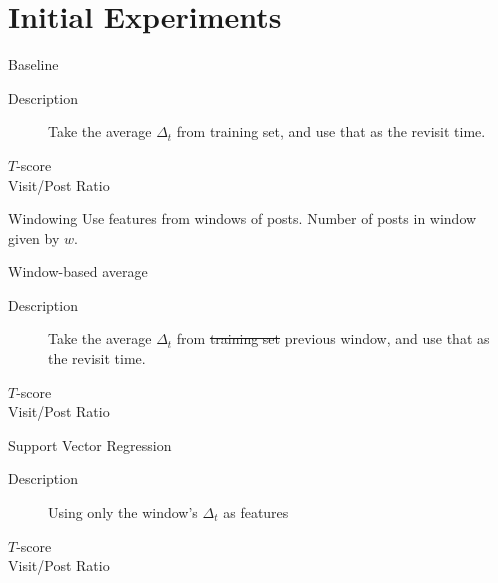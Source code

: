 \documentclass[12pt]{presentation}
\begin{document}
\section{Initial Experiments}


\begin{frame}{Baseline}
	\begin{description}
		\item[Description] Take the average $\Delta_t$ from training set, and 
			use that as the revisit time.
		\item[$T$-score]
		\item[Visit/Post Ratio]
	\end{description}
\end{frame}

\begin{frame}{Windowing}
Use features from windows of posts. Number of posts in window given by $w$.
\begin{center}

\end{center}
\end{frame}


\begin{frame}{Window-based average}
	\begin{description}
		\item[Description] Take the average $\Delta_t$ from \sout{training set} 
			previous window, and use that as the revisit time.
		\item[$T$-score]
		\item[Visit/Post Ratio]
	\end{description}
\end{frame}

\begin{frame}{Support Vector Regression}
	\begin{description}
		\item[Description] Using only the window's $\Delta_t$ as features
		\item[$T$-score]
		\item[Visit/Post Ratio]
	\end{description}
\end{frame}
\end{document}
